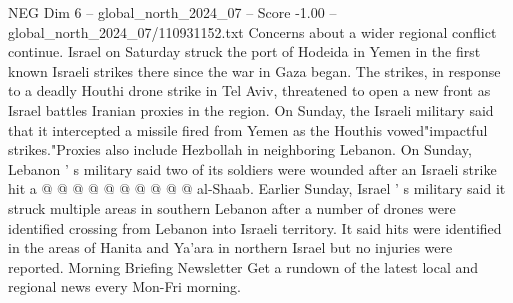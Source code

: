 \begin{textsample}{NEG Dim 6 – global\_north\_2024\_07 – Score -1.00 – global\_north\_2024\_07/110931152.txt}
Concerns about a wider regional conflict continue.
Israel on Saturday struck the port of Hodeida in Yemen in the first known Israeli strikes there since the war in Gaza began.
The strikes, in response to a deadly Houthi drone strike in Tel Aviv, threatened to open a new front as Israel battles Iranian proxies in the region.
On Sunday, the Israeli military said that it intercepted a missile fired from Yemen as the Houthis vowed"impactful strikes."Proxies also include Hezbollah in neighboring Lebanon.
On Sunday, Lebanon ' s military said two of its soldiers were wounded after an Israeli strike hit a @ @ @ @ @ @ @ @ @ @ al-Shaab.
Earlier Sunday, Israel ' s military said it struck multiple areas in southern Lebanon after a number of drones were identified crossing from Lebanon into Israeli territory.
It said hits were identified in the areas of Hanita and Ya'ara in northern Israel but no injuries were reported.
Morning Briefing Newsletter Get a rundown of the latest local and regional news every Mon-Fri morning.

\end{textsample}
